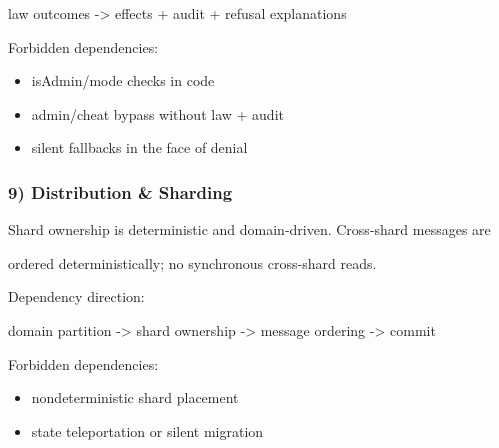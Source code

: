\documentclass[9pt,a4paper,openany]{book}
\begin{document}
law outcomes -\allowbreak{}> effects + audit + refusal explanations






Forbidden dependencies:



\begin{itemize}
\item isAdmin/\allowbreak{}mode checks in code
\end{itemize}


\begin{itemize}
\item admin/\allowbreak{}cheat bypass without law + audit
\end{itemize}


\begin{itemize}
\item silent fallbacks in the face of denial
\end{itemize}





\subsubsection{9) Distribution \& Sharding}


Shard ownership is deterministic and domain-\allowbreak{}driven.\allowbreak{} Cross-\allowbreak{}shard messages are



ordered deterministically; no synchronous cross-\allowbreak{}shard reads.\allowbreak{}






Dependency direction:



domain partition -\allowbreak{}> shard ownership -\allowbreak{}> message ordering -\allowbreak{}> commit






Forbidden dependencies:



\begin{itemize}
\item nondeterministic shard placement
\end{itemize}


\begin{itemize}
\item state teleportation or silent migration
\end{itemize}
\end{document}
